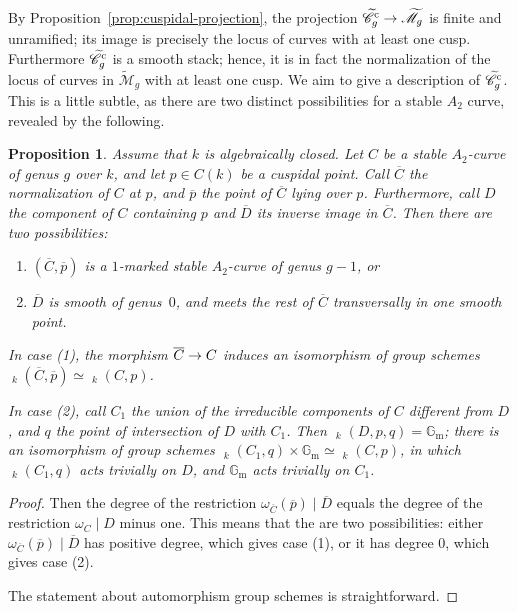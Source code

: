 \documentclass[a4paper, 10pt]{amsart}
\numberwithin{equation}{section}
\numberwithin{subsection}{section}
\newenvironment{enumerate1}
{\begin{enumerate}[\upshape (1)]}
	{\end{enumerate}}
\newtheorem{proposition}[theorem]{Proposition}
\theoremstyle{definition}
\theoremstyle{remark}
\renewcommand{\mathcal}{\mathscr}
\newcommand\GG{\mathbb{G}} \newcommand\HH{\mathbb{H}}
\newcommand\rmm{\mathrm{m}} \newcommand\rmn{\mathrm{n}}
\newcommand\arr{\ifinner\to\else\longrightarrow\fi}
\newcommand{\underaut}{\mathop{\underline{\mathrm{Aut}}}\nolimits}
\newcommand{\gm}{\GG_{\rmm}}
\newcommand{\Ctilde}{\widetilde{\mathcal C}}
\newcommand{\cu}{^{\rm c}}
\newcommand{\mt}{\widetilde{\mathcal M}}
\begin{document}
	By Proposition~\ref{prop:cuspidal-projection}, the projection $\Ctilde\cu_{g} \arr \mt_{g}$ is finite and unramified; its image is precisely the locus of curves with at least one cusp. Furthermore $\Ctilde\cu_{g}$ is a smooth stack; hence, it is in fact the normalization of the locus of curves in $\mt_{g}$ with at least one cusp. We aim to give a description of $\Ctilde\cu_{g}$. This is a little subtle, as there are two distinct possibilities for a stable $A_{2}$ curve, revealed by the following.
	
	\begin{proposition}\label{prop:description-punctual}
		Assume that $k$ is algebraically closed. Let $C$ be a stable $A_2$-curve of genus $g$ over $k$, and let $p \in C(k)$ be a cuspidal point. Call $\overline{C}$ the normalization of $C$ at $p$, and $\overline{p}$ the point of $\overline{C}$ lying over $p$. Furthermore, call $D$ the component of $C$ containing $p$ and $\overline{D}$ its inverse image in $\overline{C}$. Then there are two possibilities:
		
		\begin{enumerate1}
			
			\item $(\overline{C}, \overline{p})$ is a $1$-marked stable $A_2$-curve of genus $g-1$, or
			
			\item $\overline{D}$ is smooth of genus~$0$, and meets the rest of $\overline{C}$ transversally in one smooth point.
			
		\end{enumerate1}
		
		In case (1), the morphism $\overline{C} \arr C$ induces an isomorphism of group schemes $\underaut_{k}(\overline{C}, \overline{p}) \simeq \underaut_{k}(C, p)$.
		
		In case (2), call $C_{1}$ the union of the irreducible components of $C$ different from $D$, and $q$ the point of intersection of $D$ with $C_{1}$. Then $\underaut_{k}(D, p, q) = \gm$; there is an isomorphism of group schemes $\underaut_{k}(C_{1}, q) \times \gm \simeq \underaut_{k}(C,p)$, in which $\underaut_{k}(C_{1}, q)$ acts trivially on $D$, and $\gm$ acts trivially on $C_{1}$.
		
	\end{proposition}
	
	\begin{proof}
		Then the degree of the restriction $\omega_{\overline{C}}(\overline{p}) \mid \overline{D}$ equals the degree of the restriction $\omega_{C} \mid D$ minus one. This means that the are two possibilities: either $\omega_{\overline{C}}(\overline{p}) \mid \overline{D}$ has positive degree, which gives case (1), or it has degree $0$, which gives case (2).
		
		The statement about automorphism group schemes is straightforward.\end{proof}
	
\end{document}
